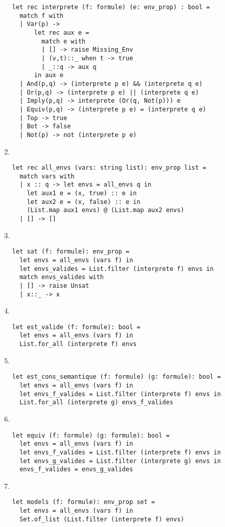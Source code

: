 \begin{enumerate}[start=4]
\begin{lstlisting}[language=caml,caption=Interprétation d'une formule]
let rec interprete (f: formule) (e: env_prop) : bool =
  match f with
  | Var(p) ->
      let rec aux e =
        match e with
        | [] -> raise Missing_Env
        | (v,t)::_ when t -> true
        | _::q -> aux q
      in aux e
  | And(p,q) -> (interprete p e) && (interprete q e)
  | Or(p,q) -> (interprete p e) || (interprete q e)
  | Imply(p,q) -> interprete (Or(q, Not(p))) e
  | Equiv(p,q) -> (interprete p e) = (interprete q e)
  | Top -> true
  | Bot -> false
  | Not(p) -> not (interprete p e)
		\end{lstlisting}
	\item~
		\begin{lstlisting}[language=caml,caption=Génération des environnements propositionnels]
let rec all_envs (vars: string list): env_prop list =
  match vars with
  | x :: q -> let envs = all_envs q in
    let aux1 e = (x, true) :: e in
    let aux2 e = (x, false) :: e in
    (List.map aux1 envs) @ (List.map aux2 envs)
  | [] -> []
		\end{lstlisting}
	\item~
		\begin{lstlisting}[language=caml,caption=Résolution du problème \textsc{Sat}]
let sat (f: formule): env_prop =
  let envs = all_envs (vars f) in
  let envs_valides = List.filter (interprete f) envs in
  match envs_valides with
  | [] -> raise Unsat
  | x::_ -> x
		\end{lstlisting}
	\item~
		\begin{lstlisting}[language=caml,caption=Résolution du problème \textsc{Valide}]
let est_valide (f: formule): bool =
  let envs = all_envs (vars f) in
  List.for_all (interprete f) envs
		\end{lstlisting}
	\item~
		\begin{lstlisting}[language=caml,caption=Vérification de ``conséquence sémantique'']
let est_cons_semantique (f: formule) (g: formule): bool =
  let envs = all_envs (vars f) in
  let envs_f_valides = List.filter (interprete f) envs in
  List.for_all (interprete g) envs_f_valides
		\end{lstlisting}
	\item~
		\begin{lstlisting}[language=caml,caption=Vérification de ``équivalence'']
let equiv (f: formule) (g: formule): bool =
  let envs = all_envs (vars f) in
  let envs_f_valides = List.filter (interprete f) envs in
  let envs_g_valides = List.filter (interprete g) envs in
  envs_f_valides = envs_g_valides
		\end{lstlisting}
	\item~
		\begin{lstlisting}[language=caml,caption=Calcul de modèles d'une formule]
let models (f: formule): env_prop set =
  let envs = all_envs (vars f) in
  Set.of_list (List.filter (interprete f) envs)
		\end{lstlisting}
\end{enumerate}
